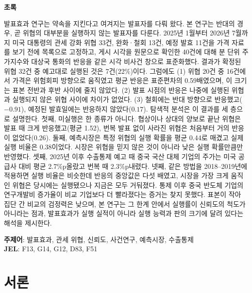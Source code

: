 \documentclass[11pt,a4paper]{article}
\newcommand{\pp}{\%p}
\begin{document}
\vspace{12pt}
\begin{center}
\begin{minipage}{0.9\textwidth}
\small\linespread{1.25}\selectfont
\begin{center}\textbf{초록}\end{center}
\noindent 발표효과 연구는 약속을 지킨다고 여겨지는 발표자를 다뤄 왔다. 본 연구는 반대의 경우, 곧 위협의 대부분을 실행하지 않는 발표자를 다룬다. 2025년 1월부터 2026년 7월까지 미국 대통령의 관세 강화 위협 33건, 완화·철회 13건, 예정 발효 11건을 가격 자료를 보기 전에 목록으로 고정하고, 게시 시각을 원문으로 확인한 40건에 대해 분 단위 주가지수와 대상국 통화의 반응을 같은 시각 비사건 창으로 표준화했다. 결과가 확정된 위협 32건 중 예고대로 실행된 것은 7건(22\%)이다. 그럼에도 (1) 위협 20건 중 16건에서 가격은 위험회피 방향으로 움직였고 평균 반응은 표준편차의 0.59배였으며, 이 크기는 표본 전반과 후반 사이에 줄지 않았다. (2) 발표 시점의 반응은 나중에 실행된 위협과 실행되지 않은 위협 사이에 차이가 없었다. (3) 철회에는 반대 방향으로 반응했고($-0.91$), 예정된 발효일에는 반응하지 않았다($0.17$). 탐색적 분석은 이 결과를 세 층으로 설명한다. 첫째, 미실행은 한 종류가 아니다. 협상이나 상대의 양보로 끝난 위협은 발표 때 크게 반응했고(평균 1.52), 번복 발표 없이 사라진 위협은 처음부터 거의 반응이 없었다(0.26). 둘째, 예측시장은 특정 위협의 실행 확률을 평균 0.44로 매겼고 실제 실행 비율은 0.38이었다. 시장은 위협을 믿지 않은 것이 아니라 낮은 실행 확률만큼만 반영했다. 셋째, 2025년 이후 수출통제 예고 때 중국 국산 대체 기업의 주가는 미국 공급사 대비 평균 2.7\pp 올랐고 번복 때 2.3\pp 내렸다. 넷째, 같은 방법을 2018--2019년에 적용하면 실행 비율은 비슷한데 반응의 중앙값은 다섯 배였고, 시장을 가장 크게 움직인 위협은 당시에는 실행됐으나 지금은 모두 거둬졌다. 통제 이후 중국 반도체 기업의 연구개발비 증가율이 비교 기업보다 더 빨라졌다는 증거는 찾지 못했다. 표본이 작아 집단 간 비교의 검정력은 낮으며, 본 연구는 그 한계 안에서 실행률이 신뢰도의 척도가 아니라는 점과, 발표효과가 실행 실적이 아니라 실행 능력과 판의 크기에 달려 있다는 해석을 제시한다.

\vspace{6pt}
\noindent\textbf{주제어}: 발표효과, 관세 위협, 신뢰도, 사건연구, 예측시장, 수출통제\\
\textbf{JEL}: F13, G14, G12, D83, F51
\end{minipage}
\end{center}
\vspace{6pt}

\section{서론}
\end{document}
